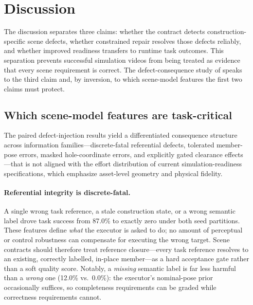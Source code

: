\section{Discussion}
\label{sec:discussion}

The discussion separates three claims: whether the contract detects
construction-specific scene defects, whether constrained repair resolves those
defects reliably, and whether improved readiness transfers to runtime task
outcomes. This separation prevents successful simulation videos from being
treated as evidence that every scene requirement is correct. The
defect-consequence study of  speaks to the third
claim and, by inversion, to which scene-model features the first two claims
must protect.

\subsection{Which scene-model features are task-critical}
\label{sec:criticality}

The paired defect-injection results yield a differentiated
consequence structure across information families---discrete-fatal
referential defects, tolerated member-pose errors, masked hole-coordinate
errors, and explicitly gated clearance effects---that is not
aligned with the effort distribution of current simulation-readiness
specifications, which emphasize asset-level geometry and physical fidelity.

\paragraph{Referential integrity is discrete-fatal.} A single wrong task
reference, a stale construction state, or a wrong semantic label drove task
success from 87.0\% to exactly zero under both seed partitions. These features
define \emph{what} the executor is asked to do; no amount of perceptual or
control robustness can compensate for executing the wrong target. Scene
contracts should therefore treat reference closure---every task reference
resolves to an existing, correctly labelled, in-place member---as a hard
acceptance gate rather than a soft quality score. Notably, a \emph{missing}
semantic label is far less harmful than a \emph{wrong} one (12.0\% vs.\ 0.0\%):
the executor's nominal-pose prior occasionally suffices, so completeness
requirements can be graded while correctness requirements cannot.

